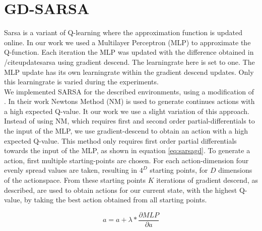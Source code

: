 
\section{GD-SARSA}
Sarsa is a variant of Q-learning where the approximation function is updated online. In our work we used a Multilayer Perceptron (MLP) to approximate the Q-function. Each iteration the MLP was updated with the difference obtained in /cite{updatesarsa} using gradient descend. The learningrate here is set to one. The MLP update has its own learningrate within the gradient descend updates. Only this learningrate is varied during the experiments. \\
\newline
We implemented SARSA for the described environments, using a modification of \cite{https://www.elen.ucl.ac.be/Proceedings/esann/esannpdf/es2014-175.pdf}. In their work Newtons Method (NM) is used to generate continues actions with a high expected Q-value.
It our work we use a slight variation of this approach. Instead of using NM, which requires first and second order partial-differentials to the input of the MLP, we use gradient-descend to obtain an action with a high expected Q-value. This method only requires first order partial differentials towards the input of the MLP, as shown in equation \eqref{eq:sarsagd}.
To generate a action, first multiple starting-points are chosen. For each action-dimension four evenly spread values are taken, resulting in $4 ^ D$ starting points, for $D$ dimensions of the actionspace. From these starting points $K$ iterations of gradient descend, as described, are used to obtain actions for our current state, with the highest Q-value, by taking the best action obtained from all starting points.


\begin{equation}
\label{eq:sarsagd}
a = a + \lambda * \frac{\partial MLP}{\partial a}
\end{equation}
